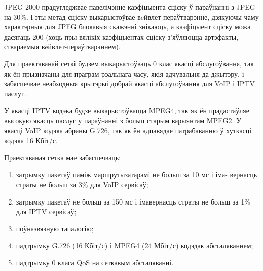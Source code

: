 JPEG-2000 прадугледжвае павелічэнне каэфіцыента сціску ў параўнанні з JPEG на 30\%. Гэты метад сціску выкарыстоўвае вeйвлет-пераўтварэнне, дзякуючы чаму характэрныя для JPEG блокавыя скажэнні знікаюць, а каэфіцыент сціску можа дасягаць 200 (хоць пры вялікіх каэфіцыентах сціску з'яўляюцца артэфакты, ствараемыя вeйвлет-пераўтварэннем).

Для праектаванай сеткі будзем выкарыстоўваць 0 клас якасці абслугоўвання, так як ён прызначаны для праграм рэальнага часу, якія адчувальня да джытэру, і забяспечвае неабходныя крытэрыі добрай якасці абслугоўвання для VoIP і IPTV паслуг.

У якасці IPTV кодэка будзе выкарыстоўвацца MPEG4, так як ён прадастаўляе
высокую якасць паслуг у параўнанні з больш старым варыянтам MPEG2.
У якасці VoIP кодэка абраны G.726, так як ён адпавядае патрабаванню ў
хуткасці кодэка 16 Кбіт/с.

Праектаваная сетка мае забяспечваць:
\begin{enumerate}
    \item затрымку пакетаў паміж маршрутызатарамі не больш за 10 мс і іма-
вернасць страты не больш за 3\% для VoIP сервісаў;
    \item затрымку пакетаў не больш за 150 мс і
імавернасць страты не больш за 1\% для IPTV сервісаў;
    \item поўназвязную тапалогію;
    \item падтрымку G.726 (16 Кбіт/с) і MPEG4 (24 Мбіт/с) кодэдак абсталяваннем;
    \item падтрымку 0 класа QoS на сеткавым абсталяванні.
\end{enumerate}
